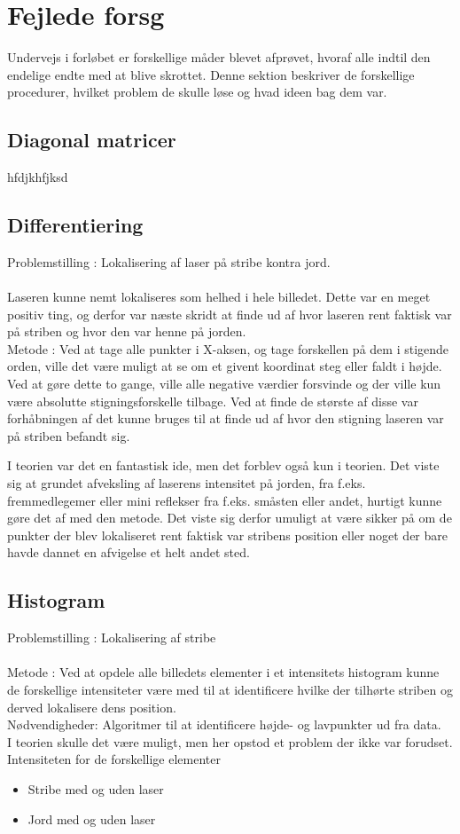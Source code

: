 \section{Fejlede forsg}
Undervejs i forløbet er forskellige måder blevet afprøvet, hvoraf alle indtil den endelige endte med at blive skrottet. Denne sektion beskriver de forskellige procedurer, hvilket problem de skulle løse og hvad ideen bag dem var.

\subsection{Diagonal matricer}

hfdjkhfjksd


\subsection{Differentiering}
Problemstilling : Lokalisering af laser på stribe kontra jord.
\\\\
Laseren kunne nemt lokaliseres som helhed i hele billedet. Dette var en meget positiv ting, og derfor var næste skridt at finde ud af hvor laseren rent faktisk var på striben og hvor den var henne på jorden.
\\
Metode : Ved at tage alle punkter i X-aksen, og tage forskellen på dem i stigende orden, ville det være muligt at se om et givent koordinat steg eller faldt i højde.
Ved at gøre dette to gange, ville alle negative værdier forsvinde og der ville kun være absolutte stigningsforskelle tilbage. Ved at finde de største af disse var forhåbningen af det kunne bruges til at finde ud af hvor den stigning laseren var på striben befandt sig.

I teorien var det en fantastisk ide, men det forblev også kun i teorien. Det viste sig at grundet afveksling af laserens intensitet på jorden, fra f.eks. fremmedlegemer eller mini reflekser fra f.eks. småsten eller andet, hurtigt kunne gøre det af med den metode.
Det viste sig derfor umuligt at være sikker på om de punkter der blev lokaliseret rent faktisk var stribens position eller noget der bare havde dannet en afvigelse et helt andet sted.

\subsection{Histogram}
Problemstilling : Lokalisering af stribe
\\\\
Metode : Ved at opdele alle billedets elementer i et intensitets histogram kunne de forskellige intensiteter være med til at identificere hvilke der tilhørte 
striben og derved lokalisere dens position.
\\
Nødvendigheder: Algoritmer til at identificere højde- og lavpunkter ud fra data.
\\
I teorien skulle det være muligt, men her opstod et problem der ikke var forudset. Intensiteten for de forskellige elementer
\begin{itemize}
	\item Stribe med og uden laser
	\item Jord med og uden laser
\end{itemize}

